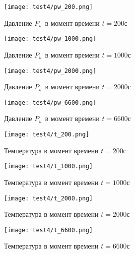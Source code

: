\begin{figure}
  \begin{center}
    \begin{minipage}[h]{0.49\textwidth}
       \texttt{[image: test4/pw\_200.png]}
       \vspace{1cm}
       \caption{Давление $P_w$ в момент времени $t=200$с}
    \end{minipage}
    \hfill
    \begin{minipage}[h]{0.49\textwidth}
       \texttt{[image: test4/pw\_1000.png]}
       \vspace{1cm}
       \caption{Давление $P_w$ в момент времени $t=1000$с}
    \end{minipage}
    \vspace{3cm}
    \vfill
    \begin{minipage}[h]{0.49\textwidth}
       \texttt{[image: test4/pw\_2000.png]}
       \vspace{1cm}
       \caption{Давление $P_w$ в момент времени $t=2000$с}
    \end{minipage}
    \hfill
    \begin{minipage}[h]{0.49\textwidth}
       \texttt{[image: test4/pw\_6600.png]}
       \vspace{1cm}
       \caption{Давление $P_w$ в момент времени $t=6600$с}
    \end{minipage}
    \hfill  
  \end{center}
\end{figure}

\begin{figure}
  \begin{center}
    \begin{minipage}[h]{0.49\textwidth}
       \texttt{[image: test4/t\_200.png]}
       \vspace{1cm}
       \caption{Температура в момент времени $t=200$с}
    \end{minipage}
    \hfill
    \begin{minipage}[h]{0.49\textwidth}
       \texttt{[image: test4/t\_1000.png]}
       \vspace{1cm}
       \caption{Температура в момент времени $t=1000$с}
    \end{minipage}
    \vspace{3cm}
    \vfill
    \begin{minipage}[h]{0.49\textwidth}
       \texttt{[image: test4/t\_2000.png]}
       \vspace{1cm}
       \caption{Температура в момент времени $t=2000$с}
    \end{minipage}
    \hfill
    \begin{minipage}[h]{0.49\textwidth}
       \texttt{[image: test4/t\_6600.png]}
       \vspace{1cm}
       \caption{Температура в момент времени $t=6600$с}
    \end{minipage}
    \hfill  
  \end{center}
\end{figure}

